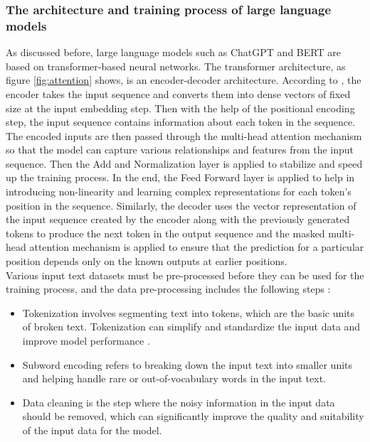 \documentclass[runningheads]{llncs}
\begin{document}
\subsubsection{The architecture and training process of large language models}
\noindent \newline
As discussed before, large language models such as ChatGPT and BERT are based on transformer-based neural networks. The transformer architecture, as figure \ref{fig:attention} shows, is an 
encoder-decoder architecture. According to \cite{Vaswani17}, the encoder takes the input sequence and converts them into dense vectors of fixed size at the input embedding step. Then with the 
help of the positional encoding step, the input sequence contains information about each token in the sequence. The encoded inputs are then passed through the multi-head attention mechanism so that the 
model can capture various relationships and features from the input sequence. Then the Add and Normalization layer is applied to stabilize and speed up the training process. In the end, the Feed Forward layer is 
applied to help in introducing non-linearity and learning complex representations for each token's position in the sequence. Similarly, the decoder uses the vector representation of the input sequence created
by the encoder along with the previously generated tokens to produce the next token in the output sequence and the masked multi-head attention mechanism is applied to ensure that the prediction for a particular position depends only on the known outputs at earlier positions. \\
\noindent \newline
Various input text datasets must be pre-processed before they can be used for the training process, and the data pre-processing includes the following steps \cite{Roum23}:
\begin{itemize}
  \item Tokenization involves segmenting text into tokens, which are the basic units of broken text. Tokenization can simplify and standardize the input data and improve model performance \cite{Devlin18}.
  \item Subword encoding refers to breaking down the input text into smaller units and helping handle rare or out-of-vocabulary words in the input text.
  \item Data cleaning is the step where the noisy information in the input data should be removed, which can significantly improve the quality and suitability of the input data for the model.
\end{itemize} 
\end{document}
